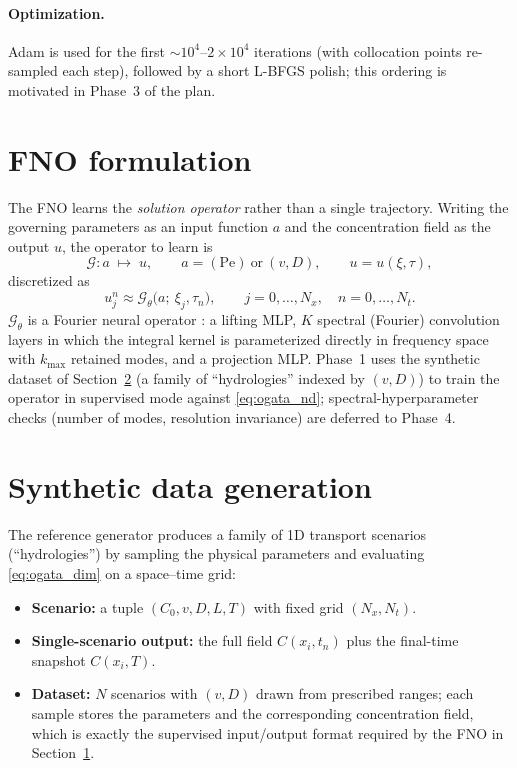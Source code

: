 \documentclass[11pt]{article}
\begin{document}
\paragraph{Optimization.} Adam is used for the first $\sim\!10^4$--$2\times10^4$
iterations (with collocation points re-sampled each step), followed by a short
L-BFGS polish; this ordering is motivated in Phase~3 of the plan.

\section{FNO formulation}
\label{sec:fno}

The FNO learns the \emph{solution operator} rather than a single trajectory.
Writing the governing parameters as an input function $a$ and the concentration
field as the output $u$, the operator to learn is
\begin{equation}
\mathcal{G}: a \;\longmapsto\; u,
\qquad a=(\mathrm{Pe})\ \text{or}\ (v,D),
\qquad u=u(\xi,\tau),
\end{equation}
discretized as
\begin{equation}
u_{j}^{n}\approx
\mathcal{G}_\theta\!\bigl(a;\ \xi_j,\tau_n\bigr),\qquad
j=0,\dots,N_x,\quad n=0,\dots,N_t .
\end{equation}
$\mathcal{G}_\theta$ is a Fourier neural operator
\citep{li2020fourier}: a lifting MLP, $K$ spectral (Fourier) convolution layers
in which the integral kernel is parameterized directly in frequency space with
$k_{\max}$ retained modes, and a projection MLP. Phase~1 uses the synthetic
dataset of Section~\ref{sec:data} (a family of ``hydrologies'' indexed by
$(v,D)$) to train the operator in supervised mode against
\eqref{eq:ogata_nd}; spectral-hyperparameter checks (number of modes, resolution
invariance) are deferred to Phase~4.

\section{Synthetic data generation}
\label{sec:data}

The reference generator produces a family of 1D transport scenarios
(``hydrologies'') by sampling the physical parameters and evaluating
\eqref{eq:ogata_dim} on a space--time grid:

\begin{itemize}
  \item \textbf{Scenario:} a tuple $(C_0,v,D,L,T)$ with fixed grid
        $(N_x,N_t)$.
  \item \textbf{Single-scenario output:} the full field
        $C(x_i,t_n)$ plus the final-time snapshot $C(x_i,T)$.
  \item \textbf{Dataset:} $N$ scenarios with $(v,D)$ drawn from prescribed
        ranges; each sample stores the parameters and the corresponding
        concentration field, which is exactly the supervised input/output format
        required by the FNO in Section~\ref{sec:fno}.
\end{itemize}
\end{document}
